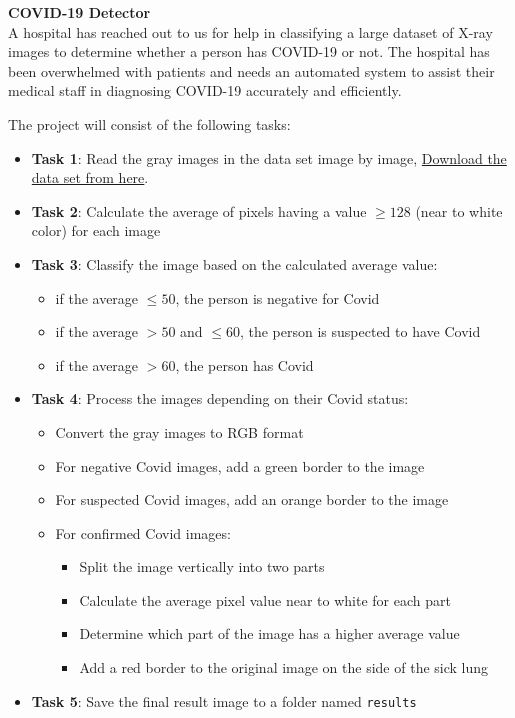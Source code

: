 \question
{\center \bf COVID-19 Detector\\}
A hospital has reached out to us for help in classifying a large dataset of X-ray images to determine whether a person has COVID-19 or not. The hospital has been overwhelmed with patients and needs an automated system to assist their medical staff in diagnosing COVID-19 accurately and efficiently.


The project will consist of the following tasks:


\begin{itemize}
    \item
      \textbf{Task 1}: Read the gray images in the data set image by image, \href{https://ydjemmada.github.io/projects/xrays.rar}{Download the data set from here}.
    \item
      \textbf{Task 2}: Calculate the average of pixels having a value $\geq 128$ (near to white color) for each image
    \item
      \textbf{Task 3}: Classify the image based on the calculated average
      value:
    
      \begin{itemize}

      \item
        if the average $\leq 50$, the person is negative for Covid
      \item
        if the average $>50$ and $\leq 60$, the person is
        suspected to have Covid
      \item
        if the average $>60$, the person has Covid
      \end{itemize}
    \item
      \textbf{Task 4}: Process the images depending on their Covid status:
    
      \begin{itemize}

      \item
        Convert the gray images to RGB format
      \item
        For negative Covid images, add a green border to the image
      \item
        For suspected Covid images, add an orange border to the image
      \item
        For confirmed Covid images:
    
        \begin{itemize}

        \item
          Split the image vertically into two parts
        \item
          Calculate the average pixel value near to white for each part
        \item
          Determine which part of the image has a higher average value
        \item
          Add a red border to the original image on the side of the sick
          lung
        \end{itemize}
      \end{itemize}
    \item
      \textbf{Task 5}: Save the final result image to a folder named \verb|results|
    \end{itemize}
